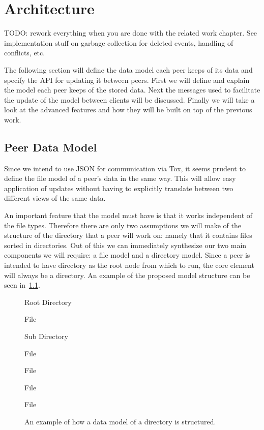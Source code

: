 \chapter{Architecture}
\label{chap:architecture}

TODO: rework everything when you are done with the related work chapter.
See implementation stuff on garbage collection for deleted events, handling of conflicts, etc.

The following section will define the data model each peer keeps of its data and specify the API for updating it between peers.
First we will define and explain the model each peer keeps of the stored data.
Next the messages used to facilitate the update of the model between clients will be discussed.
Finally we will take a look at the advanced features and how they will be built on top of the previous work.

\section{Peer Data Model}


Since we intend to use JSON for communication via Tox, it seems prudent to define the file model of a peer's data in the same way.
This will allow easy application of updates without having to explicitly translate between two different views of the same data.

An important feature that the model must have is that it works independent of the file types.
Therefore there are only two assumptions we will make of the structure of the directory that a peer will work on: namely that it contains files sorted in directories.
Out of this we can immediately synthesize our two main components we will require: a file model and a directory model.
Since a peer is intended to have directory as the root node from which to run, the core element will always be a directory.
An example of the proposed model structure can be seen in~\ref{list:model}.

\begin{figure}[htp]
\begin{modellist}
\item Root Directory
    \begin{modellist}
        \item File
        \item Sub Directory
            \begin{modellist}
                \item File
                \item File
            \end{modellist}
        \item File
        \item File
    \end{modellist}
\end{modellist}
\caption[Data Model Example Structure]{An example of how a data model of a directory is structured.}
\label{list:model}
\end{figure}

